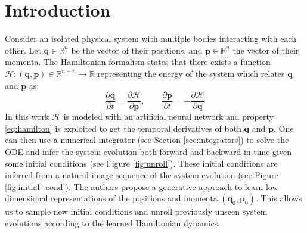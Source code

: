 \section{Introduction}


Consider an isolated physical system with multiple bodies interacting with each other.
Let $\bm{q} \in \mathbb{R}^n$ be the vector of their positions, and $\bm{p} \in \mathbb{R}^n$ the vector of their momenta.
The Hamiltonian formalism \cite{hamilton} states that there exists a function $\mathcal{H} : (\bm{q}, \bm{p}) \in \mathbb{R}^{n + n} \rightarrow \mathbb{R}$ representing the energy of the system which relates $\bm{q}$ and $\bm{p}$ as:
\begin{equation}
\frac{\partial \bm{q}}{\partial t} = \frac{\partial \mathcal{H}}{\partial \bm{p}}, \qquad
\frac{\partial \bm{p}}{\partial t} = -\frac{\partial \mathcal{H}}{\partial \bm{q}}
\label{eq:hamilton}
\end{equation}
In this work $\mathcal{H}$ is modeled with an artificial neural network and property \ref{eq:hamilton} is exploited to get the temporal derivatives of both $\bm{q}$ and $\bm{p}$.
One can then use a numerical integrator (see Section \ref{sec:integrators}) to solve the ODE and infer the system evolution both forward and backward in time given some initial conditions (see Figure \ref{fig:unroll}).
These initial conditions are inferred from a natural image sequence of the system evolution (see Figure \ref{fig:initial_cond}).
The authors propose a generative approach to learn low-dimensional representations of the positions and momenta $(\bm{q}_0, \bm{p}_0)$.
This allows us to sample new initial conditions and unroll previously unseen system evolutions according to the learned Hamiltonian dynamics.

